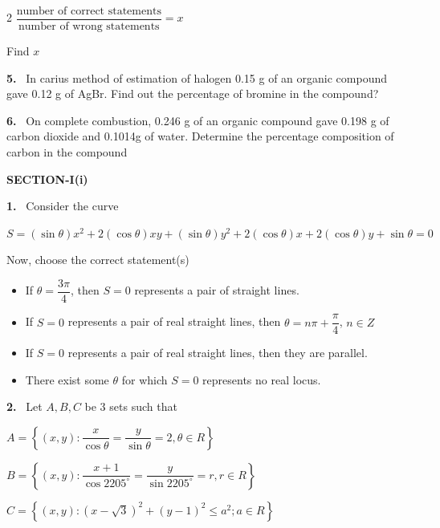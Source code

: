 \documentclass[10pt]{extarticle}
\newcommand{\partsec}[2]{\par\medskip\noindent{\large\bfseries PART-#1: #2}\par\smallskip}
\newcommand{\sect}[1]{\par\smallskip\noindent\textbf{#1}\par}
\newcommand{\qn}[1]{\par\smallskip\noindent\textbf{#1.}~}
\newenvironment{qoptions}{\begin{itemize}[leftmargin=1.8em,itemsep=1pt,topsep=2pt,label={}]}{\end{itemize}}
\newcommand{\opt}[2]{\item[(#1)] #2}
\begin{document}
\begin{multicols}{2}
$\dfrac{\text{number of correct statements}}{\text{number of wrong statements}}=x$

Find $x$
\qn{5} In carius method of estimation of halogen 0.15 g of an organic compound gave 0.12 g of AgBr. Find out the percentage of bromine in the compound?
\qn{6} On complete combustion, 0.246 g of an organic compound gave 0.198 g of carbon dioxide and 0.1014g of water. Determine the percentage composition of carbon in the compound
\partsec{3}{MATHEMATICS}
\sect{SECTION-I(i)}
\qn{1} Consider the curve

$S=(\sin\theta)x^2+2(\cos\theta)xy+(\sin\theta)y^2+2(\cos\theta)x+2(\cos\theta)y+\sin\theta=0$

Now, choose the correct statement(s)
\begin{qoptions}
\opt{A}{If $\theta=\dfrac{3\pi}4$, then $S=0$ represents a pair of straight lines.}
\opt{B}{If $S=0$ represents a pair of real straight lines, then $\theta=n\pi+\dfrac\pi4$, $n\in Z$}
\opt{C}{If $S=0$ represents a pair of real straight lines, then they are parallel.}
\opt{D}{There exist some $\theta$ for which $S=0$ represents no real locus.}
\end{qoptions}
\qn{2} Let $A,B,C$ be 3 sets such that

$A=\left\{(x,y):\dfrac x{\cos\theta}=\dfrac y{\sin\theta}=2,\theta\in R\right\}$

$B=\left\{(x,y):\dfrac{x+1}{\cos2205^\circ}=\dfrac y{\sin2205^\circ}=r,r\in R\right\}$

$C=\left\{(x,y):(x-\sqrt3)^2+(y-1)^2\leqslant a^2;a\in R\right\}$


\end{multicols}
\end{document}
